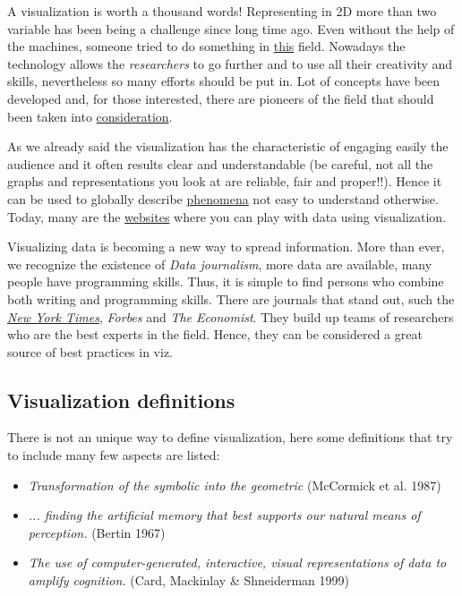 A visualization is worth a thousand words! Representing in 2D more than two variable has been being a challenge since long time ago. Even without the help of the machines, someone tried to do something in \href{https://en.wikipedia.org/wiki/Charles\_Joseph\_Minard}{this} field. Nowadays the technology allows the \emph{researchers} to go further and to use all their creativity and skills, nevertheless so many efforts should be put in. Lot of concepts have been developed and, for those interested, there are pioneers of the field that should been taken into \href{https://en.wikipedia.org/wiki/Edward\_Tufte}{consideration}.

As we already said the visualization has the characteristic of engaging easily the audience and it often results clear and understandable (be careful, not all the graphs and representations you look at are reliable, fair and proper!!). Hence it can be used to globally describe \href{https://www.ted.com/talks/hans\_rosling\_shows\_the\_best\_stats\_you\_ve\_ever\_seen}{phenomena} not easy to understand otherwise. Today, many are the \href{https://www.gapminder.org/tools/#\_chart-type=bubbles\&state\_time\_end=2015;\&entities\%2F\_minimap\_show\_geo.cat@=main\%2F\_religion\%2F\_2008;;;\&marker_color\_which=geo.main\%2F\_religion\%2F\_2008}{websites} where you can play with data using visualization.

Visualizing data is becoming a new way to spread information. More than ever, we recognize the existence of \emph{Data journalism}, more data are available, many people have programming skills. Thus, it is simple to find persons who combine both writing and programming skills. There are journals that stand out, such the \href{http://www.nytimes.com/interactive/2014/06/05/upshot/how-the-recession-reshaped-the-economy-in-255-charts.html?\_r=0}{\emph{New York Times}}, \emph{Forbes} and \emph{The Economist}. They build up teams of researchers who are the best experts in the field. Hence, they can be considered a great source of best practices in viz.

\subsection{Visualization definitions}

There is not an unique way to define visualization, here some definitions that try to include many few aspects are listed:

\begin{itemize}
\item \emph{Transformation of the symbolic into the geometric} (McCormick et al. 1987) 
\item \emph{... finding the artificial memory that best supports our natural means of perception.} (Bertin 1967)
\item \emph{The use of computer-generated, interactive, visual representations of data to amplify cognition.} (Card, Mackinlay \& Shneiderman 1999) 
\end{itemize}

